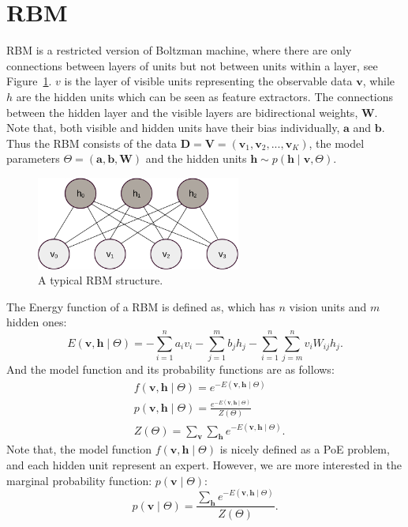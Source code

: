 \documentclass[11pt,twoside,a4paper]{article}
\begin{document}
\section{RBM\cite{zhang2013rbm}}
	RBM is a restricted version of Boltzman machine, where there are only connections between layers of units but not between units within a layer, see Figure~\ref{fig:RBM}.
	$ v $ is the layer of visible units representing the observable data $ \mathbf{v} $, while $ h $ are the hidden units which can be seen as feature extractors.
	The connections between the hidden layer and the visible layers are bidirectional weights, $ \mathbf{W} $.
	Note that, both visible and hidden units have their bias individually, $ \mathbf{a} $ and $ \mathbf{b} $.
	Thus the RBM consists of the data $ \mathbf{D} = \mathbf{V} = (\mathbf{v}_1, \mathbf{v}_2, ..., \mathbf{v}_K ) $, the model parameters $ \Theta = (\mathbf{a}, \mathbf{b}, \mathbf{W}) $ and the hidden units $ \mathbf{h} \sim p(\mathbf{h} \mid \mathbf{v}, \Theta) $.
	\begin{figure}[hbt]
	\centering
		\includegraphics[width=0.6\textwidth]{img/RBM.pdf}
		\caption{A typical RBM structure.}
		\label{fig:RBM}
	\end{figure}
	
	The Energy function of a RBM is defined as, which has $ n $ vision units and $ m $ hidden ones:
	\begin{equation}
		E(\mathbf{v}, \mathbf{h} \mid \Theta)= -\sum_{i=1}^n a_i v_i - \sum_{j=1}^m b_j h_j - \sum_{i=1}^n \sum_{j=m}^n v_i W_{ij} h_j.
	\end{equation}
	And the model function and its probability functions are as follows:
	\begin{equation}
		\begin{aligned}
		& f(\mathbf{v}, \mathbf{h} \mid \Theta) =e^{-E(\mathbf{v}, \mathbf{h} \mid \Theta)} \\
		& p(\mathbf{v}, \mathbf{h} \mid \Theta) =\frac{e^{-E(\mathbf{v}, \mathbf{h} \mid \Theta)}}{Z(\Theta)}\\
		& Z(\Theta) = \sum_{\mathbf{v}} \sum_{\mathbf{h}} e^{-E(\mathbf{v}, \mathbf{h} \mid \Theta)}.
		\end{aligned}
	\end{equation}
	Note that, the model function $ f(\mathbf{v}, \mathbf{h} \mid \Theta) $ is nicely defined as a PoE problem, and each hidden unit represent an expert.
	However, we are more interested in the marginal probability function: $ p(\mathbf{v} \mid \Theta) $:
	\begin{equation}
		p(\mathbf{v} \mid \Theta) =\frac{\sum_{ \mathbf{h}} e^{-E(\mathbf{v}, \mathbf{h} \mid \Theta)}}{Z(\Theta)}.
	\end{equation}		
\end{document}
